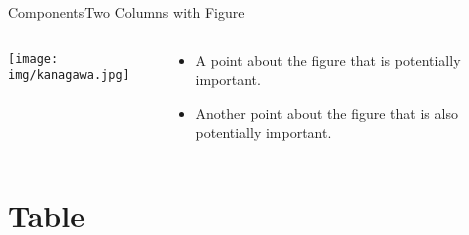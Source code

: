 \documentclass[aspectratio=43]{beamer}
\begin{document}
\begin{frame}{Components}{Two Columns with Figure}
    \begin{columns}[T]
    \vspace{0pt}
    \begin{column}{.60\textwidth}
        \texttt{[image: img/kanagawa.jpg]}

        \vspace*{50mm} %
    \end{column}
    
    \hfill
    
    \begin{column}{.40\textwidth}
        \begin{itemize}
            \item A point about the figure that is potentially important.
            \item Another point about the figure that is also potentially important.
        \end{itemize}
    \end{column}
    \end{columns}
\end{frame}

\section{Table}
\end{document}
